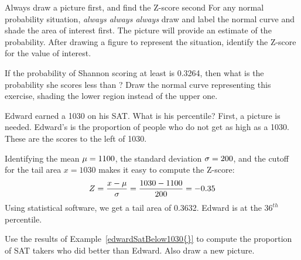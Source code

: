 \begin{onebox}{Always draw a picture first,
    and find the Z-score second}
  For any normal probability situation,
  \emph{always always always} draw and label the
  normal curve and shade the area of interest first.
  The picture will provide an estimate of the probability.
  After drawing a figure to represent the situation,
  identify the Z-score for the value of interest.
\end{onebox}

\begin{exercisewrap}
\begin{nexercise}
If the probability of Shannon scoring at least \shannonsat{}
is 0.3264, then what is the probability she scores less than
\shannonsat{}?
Draw the normal curve representing this exercise,
shading the lower region instead of the upper one.\footnotemark{}
\end{nexercise}
\end{exercisewrap}


\newcommand{\edwardsat}{1030}
\newcommand{\edwardsatz}{-0.35}
\newcommand{\edwardsatlower}{0.3632}
\begin{examplewrap}
\begin{nexample}{Edward earned a \edwardsat{} on his SAT.
    What is his percentile?}
  \label{edwardSatBelow\edwardsat{}}%
  First, a picture is needed.
  Edward's  is the proportion of people
  who do not get as high as a \edwardsat{}.
  These are the scores to the left of \edwardsat{}.
\begin{center}
\end{center}
Identifying the mean $\mu=1100{}$, the standard
deviation $\sigma=200{}$, and the cutoff for the tail
area $x=\edwardsat{}$ makes it easy to compute the Z-score:
\begin{align*}
Z
  = \frac{x - \mu}{\sigma}
  = \frac{\edwardsat{} - \satmean{}}{\satsd{}}
  = \edwardsatz{}
\end{align*}
Using statistical software, we get a tail area of 0.3632.
Edward is at the $36^{th}$ percentile.
\end{nexample}
\end{examplewrap}

\begin{exercisewrap}
\begin{nexercise}
Use the results of Example~\ref{edwardSatBelow\edwardsat{}}
to compute the proportion of SAT takers who did better than
Edward.
Also draw a new picture.\footnotemark{}
\end{nexercise}
\end{exercisewrap}

